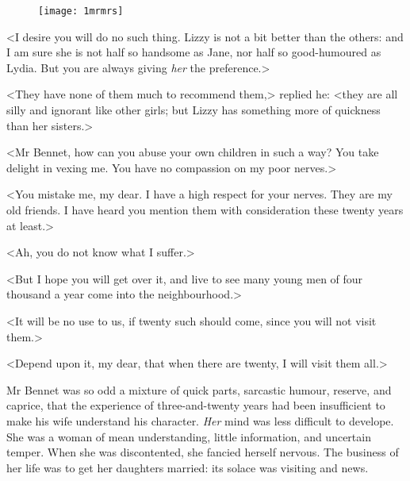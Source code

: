 \begin{figure}[bh!]
\centering
\texttt{[image: 1mrmrs]}
\end{figure}

<I desire you will do no such thing. Lizzy is not a bit better than the others: and I am sure she is not half so handsome as Jane, nor half so good-humoured as Lydia. But you are always giving \textit{her} the preference.>

<They have none of them much to recommend them,> replied he: <they are all silly and ignorant like other girls; but Lizzy has something more of quickness than her sisters.>

<Mr Bennet, how can you abuse your own children in such a way? You take delight in vexing me. You have no compassion on my poor nerves.>

<You mistake me, my dear. I have a high respect for your nerves. They are my old friends. I have heard you mention them with consideration these twenty years at least.>

<Ah, you do not know what I suffer.>

<But I hope you will get over it, and live to see many young men of four thousand a year come into the neighbourhood.>

<It will be no use to us, if twenty such should come, since you will not visit them.>

<Depend upon it, my dear, that when there are twenty, I will visit them all.>

Mr Bennet was so odd a mixture of quick parts, sarcastic humour, reserve, and caprice, that the experience of three-and-twenty years had been insufficient to make his wife understand his character. \textit{Her} mind was less difficult to develope. She was a woman of mean understanding, little information, and uncertain temper. When she was discontented, she fancied herself nervous. The business of her life was to get her daughters married: its solace was visiting and news.

